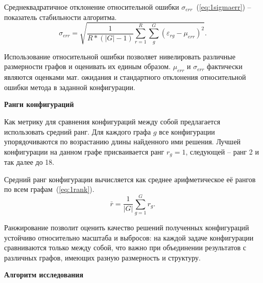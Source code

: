 Среднеквадратичное отклонение относительной ошибки $\sigma_{err}$~(\ref{eq:1sigmaerr}) -- показатель стабильности алгоритма.
\begin{equation}
\sigma_{err} = \sqrt{\frac{1}{R*(|G|-1)} \sum_{r=1}^{R}\sum_{g}^{G} (\varepsilon_{rg} - \mu_{err})^2}.
\label{eq:1sigmaerr}
\end{equation}

Использование относительной ошибки позволяет нивелировать различные размерности графов и оценивать их единым образом. $\mu_{err}$ и $\sigma_{err}$ фактически являются оценками мат. ожидания и стандартного отклонения относительной ошибки метода в заданной конфигурации.

\textbf{Ранги конфигураций}

Как метрику для сравнения конфигураций между собой предлагается использовать средний ранг. Для каждого графа $g$ все конфигурации упорядочиваются по возрастанию длины найденного ими решения. Лучшей конфигурации на данном графе присваивается ранг $r_g = 1$, следующей -- ранг 2 и так далее до 18.

Средний ранг конфигурации вычисляется как среднее арифметическое её рангов по всем графам~(\ref{eq:1rank}).
\begin{equation}
\bar{r} = \frac{1}{|G|} \sum_{g=1}^{G} r_g.
\label{eq:1rank}
\end{equation}

Ранжирование позволит оценить качество решений полученных конфигураций устойчиво относительно масштаба и выбросов: на каждой задаче конфигурации сравниваются только между собой, что важно при объединении результатов с различных графов, имеющих разную размерность и структуру.

\textbf{Алгоритм исследования}

